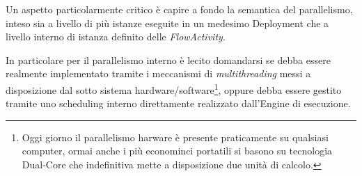 



Un aspetto particolarmente critico è capire a fondo la semantica del
parallelismo, inteso sia a livello di più istanze eseguite in un medesimo Deployment che a
livello interno di istanza definito delle \emph{FlowActivity}. 

In particolare per il parallelismo interno è lecito domandarsi se debba essere
realmente implementato tramite i meccanismi di \emph{multithreading} messi a
disposizione dal sotto sistema hardware/software\footnote{Oggi giorno il
parallelismo harware è presente praticamente su qualsiasi computer, ormai anche i
più econominci portatili si basono su tecnologia Dual-Core che indefinitiva mette
a disposizione due unità di calcolo.}, oppure debba essere gestito tramite uno
scheduling interno direttamente realizzato dall'Engine di esecuzione.

